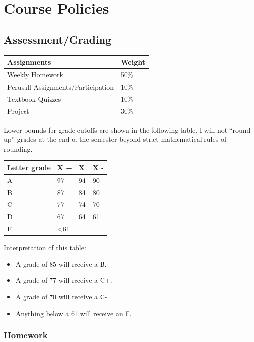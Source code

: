 \documentclass[
  11pt,
  letterpaper,
  DIV=11,
  numbers=noendperiod]{scrartcl}
\providecommand{\tightlist}{%
  \setlength{\itemsep}{0pt}\setlength{\parskip}{0pt}}\usepackage{longtable,booktabs,array}
\begin{document}
\hypertarget{course-policies}{%
\section{Course Policies}\label{course-policies}}

\hypertarget{assessmentgrading}{%
\subsection{Assessment/Grading}\label{assessmentgrading}}

\begin{longtable}[]{@{}ll@{}}
\toprule()
Assignments & Weight \\
\midrule()
\endhead
Weekly Homework & 50\% \\
Perusall Assignments/Participation & 10\% \\
Textbook Quizzes & 10\% \\
Project & 30\% \\
\bottomrule()
\end{longtable}

Lower bounds for grade cutoffs are shown in the following table. I will
not ``round up'' grades at the end of the semester beyond strict
mathematical rules of rounding.

\begin{longtable}[]{@{}llll@{}}
\toprule()
Letter grade & X + & X & X - \\
\midrule()
\endhead
A & 97 & 94 & 90 \\
B & 87 & 84 & 80 \\
C & 77 & 74 & 70 \\
D & 67 & 64 & 61 \\
F & \textless61 & & \\
\bottomrule()
\end{longtable}

Interpretation of this table:

\begin{itemize}
\tightlist
\item
  A grade of 85 will receive a B.
\item
  A grade of 77 will receive a C+.
\item
  A grade of 70 will receive a C-.
\item
  Anything below a 61 will receive an F.
\end{itemize}

\hypertarget{homework}{%
\subsubsection{Homework}\label{homework}}
\end{document}
